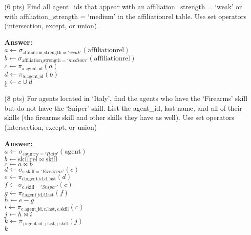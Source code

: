 \begin{questions}
\vspace{15 mm}

\question (6 pts) Find all agent\_ids that appear with an affiliation\_strength = `weak' or with affiliation\_strength = `medium' in the affiliationrel table.  Use set operators (intersection, except, or union).

\textbf{Answer:} \\
$a \leftarrow \sigma_{\text{affiliation\_strength} = 'weak'} (\text{affiliationrel})$\\
$b \leftarrow \sigma_{\text{affiliation\_strength} = 'medium'} (\text{affiliationrel})$\\
$c \leftarrow \pi_{\text{a.agent\_id}}(a)$\\
$d \leftarrow \pi_{\text{b.agent\_id}}(b)$\\
$e \leftarrow c \cup d$\\
$e$
\vspace{15 mm}

\question (8 pts) For agents located in `Italy', find the agents who have the `Firearms' skill but do not have the `Sniper' skill. List the agent\_id, last name, and all of their skills (the firearms skill and other skills they have as well). Use set operators (intersection, except, or union)

\textbf{Answer:} \\
$a \leftarrow \sigma_{\text{country} = 'Italy'}(\text{agent})$ \\  
$b \leftarrow \text{skillrel} \bowtie \text{skill}$ \\  
$c \leftarrow a \bowtie b$ \\  
$d \leftarrow \sigma_{\text{c.skill} = 'Firearms'}(c)$ \\  
$e \leftarrow \pi_{\text{d.agent\_id}, \text{d.last}}(d)$ \\  
$f \leftarrow \sigma_{\text{c.skill} = 'Sniper'}(c)$ \\  
$g \leftarrow \pi_{\text{f.agent\_id}, \text{f.last}}(f)$ \\  
$h \leftarrow e - g $\\  
$i \leftarrow \pi_{\text{c.agent\_id}, \text{c.last}, \text{c.skill}}(c)$ \\  
$j \leftarrow h \bowtie i$ \\  
$k \leftarrow \pi_{\text{j.agent\_id}, \text{j.last}, \text{j.skill}}(j)$ \\
$k$ \\
\vspace{15 mm}


\end{questions}
